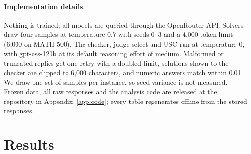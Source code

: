 \documentclass[letterpaper]{article} %
\begin{document}
\paragraph{Implementation details.}
Nothing is trained; all models are queried through the OpenRouter API. Solvers draw four samples at temperature 0.7 with seeds 0--3 and a 4{,}000-token limit (6{,}000 on MATH-500). The checker, judge-select and USC run at temperature 0, with gpt-oss-120b at its default reasoning effort of medium. Malformed or truncated replies get one retry with a doubled limit, solutions shown to the checker are clipped to 6{,}000 characters, and numeric answers match within 0.01. We draw one set of samples per instance, so seed variance is not measured. Frozen data, all raw responses and the analysis code are released at the repository in Appendix~\ref{app:code}; every table regenerates offline from the stored responses.

\section{Results}
\label{sec:results}
\end{document}
